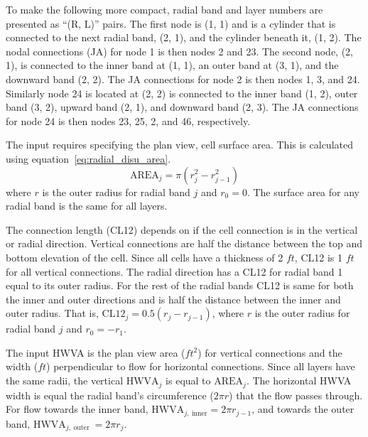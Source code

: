 

To make the following more compact, radial band and layer numbers are presented as ``(R, L)'' pairs. The first node is (1, 1) and is a cylinder that is connected to the next radial band, (2, 1), and the cylinder beneath it, (1, 2). The nodal connections (JA) for node 1 is then nodes 2 and 23. The second node, (2, 1), is connected to the inner band at (1, 1), an outer band at (3, 1), and the downward band (2, 2). The JA connections for node 2 is then nodes 1, 3, and 24. Similarly node 24 is located at (2, 2) is connected to the inner band (1, 2), outer band (3, 2), upward band (2, 1), and downward band (2, 3). The JA connections for node 24 is then nodes 23, 25, 2, and 46, respectively.

The input requires specifying the plan view, cell surface area. This is calculated using equation~\ref{eq:radial_disu_area}.
\begin{equation}
   \text{AREA}_j = \pi\left(r_j^2-r_{j-1}^2\right)
   \label{eq:radial_disu_area}
\end{equation}
where $r$ is the outer radius for radial band $j$ and $r_0=0$. The surface area for any radial band is the same for all layers.

The connection length (CL12) depends on if the cell connection is in the vertical or radial direction. Vertical connections are half the distance between the top and bottom elevation of the cell. Since all cells have a thickness of 2 $ft$, CL12 is 1 $ft$ for all vertical connections. The radial direction has a CL12 for radial band 1 equal to its outer radius. For the rest of the radial bands CL12 is same for both the inner and outer directions and is half the distance between the inner and outer radius. That is, $\text{CL12}_j = 0.5\left(r_j-r_{j-1}\right)$, where $r$ is the outer radius for radial band $j$ and $r_0={-r}_1$. 

The input HWVA is the plan view area ($ft^2$) for vertical connections and the width ($ft$) perpendicular to flow for horizontal connections. Since all layers have the same radii, the vertical $\text{HWVA}_j$ is equal to $\text{AREA}_j$. The horizontal HWVA width is equal the radial band’s circumference ($2\pi r$) that the flow passes through. For flow towards the inner band, $\text{HWVA}_{j,\ \text{inner}} = 2\pi r_{j-1}$, and towards the outer band, $\text{HWVA}_{j,\ \text{outer}}\ = 2\pi r_j$.

